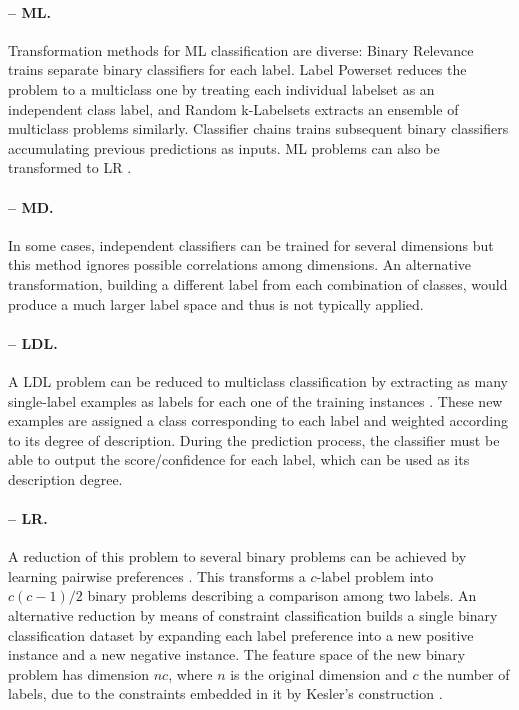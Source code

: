\documentclass[
	fontsize=11pt, %
	twoside=false, %
	open=any, %
	secnumdepth=1, %
]{kaobook}
\begin{document}
\paragraph{-- ML.} 
Transformation methods for ML classification \cite{mlmethods} are diverse: Binary Relevance trains separate binary classifiers for each label. Label Powerset reduces the problem to a multiclass one by treating each individual labelset as an independent class label, and Random k-Labelsets \cite{ml-rakel} extracts an ensemble of multiclass problems similarly. Classifier chains \cite{ml-chains} trains subsequent binary classifiers accumulating previous predictions as inputs. ML problems can also be transformed to LR \cite{ml-clr}.

\paragraph{-- MD.} In some cases, independent classifiers can be trained for several dimensions \cite{mdc,mdc-indep} but this method ignores possible correlations among dimensions. An alternative transformation, building a different label from each combination of classes, would produce a much larger label space and thus is not typically applied.

\paragraph{-- LDL.} A LDL problem can be reduced to multiclass classification by extracting as many single-label examples as labels for each one of the training instances \cite{ldl}. These new examples are assigned a class corresponding to each label and weighted according to its degree of description. During the prediction process, the classifier must be able to output the score/confidence for each label, which can be used as its description degree.

\paragraph{-- LR.} A reduction of this problem to several binary problems can be achieved by learning pairwise preferences \cite{lrankpairwise}. This transforms a $c$-label problem into $c(c-1)/2$ binary problems describing a comparison among two labels. An alternative reduction by means of constraint classification \cite{lr-constraint} builds a single binary classification dataset by expanding each label preference into a new positive instance and a new negative instance. The feature space of the new binary problem has dimension $nc$, where $n$ is the original dimension and $c$ the number of labels, due to the constraints embedded in it by Kesler's construction \cite{nilsson}.
\end{document}
